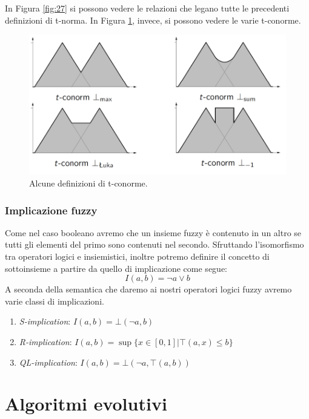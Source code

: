 \documentclass[10pt,a4paper]{article}
\begin{document}
In Figura \ref{fig:27} si possono vedere le relazioni che legano tutte le precedenti definizioni di t-norma. In Figura \ref{fig:28}, invece, si possono vedere le varie t-conorme.

\begin{figure}
\centering
\includegraphics[scale=0.3]{img/tconorme.png}
\caption{Alcune definizioni di t-conorme.}
\label{fig:28}
\end{figure}

\subsubsection{Implicazione fuzzy}

Come nel caso booleano avremo che un insieme fuzzy è contenuto in un altro se tutti gli elementi del primo sono contenuti nel secondo. Sfruttando l'isomorfismo tra operatori logici e insiemistici, inoltre potremo definire il concetto di sottoinsieme a partire da quello di implicazione come segue:
$$
I(a,b) = \neg a \vee b
$$
A seconda della semantica che daremo ai nostri operatori logici fuzzy avremo varie classi di implicazioni. 

\begin{enumerate}
\item{\emph{S-implication}: $I(a,b) = \bot(\neg a, b)$}
\item{\emph{R-implication}: $I(a,b) = \sup \{x \in [0,1] | \top(a,x) \leq b\}$}
\item{\emph{QL-implication}: $I(a,b) = \bot(\neg a, \top(a,b))$}
\end{enumerate}

\section{Algoritmi evolutivi}
\end{document}
